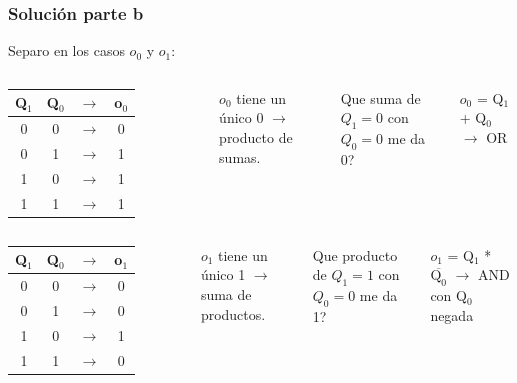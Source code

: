 \documentclass[10pt]{beamer}
\begin{document}
\begin{frame}
\frametitle{Solución parte b}
\begin{mdframed}[backgroundcolor=frenchblue!20]
  \begin{center}
  Separo en los casos $o_0$ y $o_1$:
  \end{center}
\end{mdframed}
\pause
\begin{columns}
        \begin{table}[h!]
            \begin{tabular}{|c|c|c|c|}
            \hline
            Q$_1$ & Q$_0$ & $\to$ &  o$_0$ \\ \hline
            0        & 0        & $\to$           & 0          \\ \hline
            0        & 1        &$\to$            & 1          \\ \hline
            1        & 0        &$\to$            & 1          \\ \hline
            1        & 1        &$\to$            & 1          \\ \hline
            \end{tabular}
            \end{table}

    \pause

    $o_0$ tiene un único 0 $\to$ producto de sumas.
\pause

  Que suma de $Q_1=0$ con $Q_0=0$ me da 0?
\pause

    $o_0$ = Q$_1$ + Q$_0$ \pause $\to$ OR
\end{columns}
\pause
\vspace{0.5cm}
\begin{columns}
        \begin{table}[h!]
            \begin{tabular}{|c|c|c|c|}
            \hline
            Q$_1$ & Q$_0$ & $\to$ & o$_1$  \\ \hline
            0        & 0        & $\to$ & 0                  \\ \hline
            0        & 1        &$\to$  & 0                  \\ \hline
            1        & 0        &$\to$  & 1                  \\ \hline
            1        & 1        &$\to$  & 0                  \\ \hline
            \end{tabular}
            \end{table}

    \pause
    $o_1$ tiene un único 1 $\to$ suma de productos.
    \pause

    Que producto de $Q_1=1$ con $Q_0=0$ me da 1?
    \pause

    $o_1$ = Q$_1$ * $\overline{\text{Q}_0}$  \pause $\to$ AND con  Q$_0$ negada


\end{columns}

\end{frame}
\end{document}
